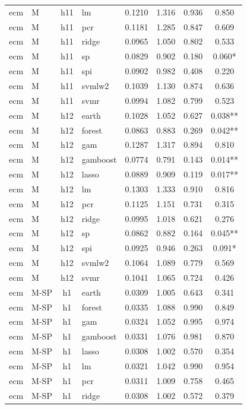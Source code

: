 \begin{ThreePartTable}
\begin{longtable}[t]{llclcccc}
ecm & M & h11 & lm & 0.1210 & 1.316 & 0.936 & 0.850\\
ecm & M & h11 & pcr & 0.1181 & 1.285 & 0.847 & 0.609\\
ecm & M & h11 & ridge & 0.0965 & 1.050 & 0.802 & 0.533\\
ecm & M & h11 & sp & 0.0829 & 0.902 & 0.180 & 0.060*\\
ecm & M & h11 & spi & 0.0902 & 0.982 & 0.408 & 0.220\\
ecm & M & h11 & svmlw2 & 0.1039 & 1.130 & 0.874 & 0.636\\
ecm & M & h11 & svmr & 0.0994 & 1.082 & 0.799 & 0.523\\
\addlinespace
ecm & M & h12 & earth & 0.1028 & 1.052 & 0.627 & 0.038**\\
ecm & M & h12 & forest & 0.0863 & 0.883 & 0.269 & 0.042**\\
ecm & M & h12 & gam & 0.1287 & 1.317 & 0.894 & 0.810\\
ecm & M & h12 & gamboost & 0.0774 & 0.791 & 0.143 & 0.014**\\
ecm & M & h12 & lasso & 0.0889 & 0.909 & 0.119 & 0.017**\\
ecm & M & h12 & lm & 0.1303 & 1.333 & 0.910 & 0.816\\
ecm & M & h12 & pcr & 0.1125 & 1.151 & 0.731 & 0.315\\
ecm & M & h12 & ridge & 0.0995 & 1.018 & 0.621 & 0.276\\
ecm & M & h12 & sp & 0.0862 & 0.882 & 0.164 & 0.045**\\
ecm & M & h12 & spi & 0.0925 & 0.946 & 0.263 & 0.091*\\
ecm & M & h12 & svmlw2 & 0.1064 & 1.089 & 0.779 & 0.569\\
ecm & M & h12 & svmr & 0.1041 & 1.065 & 0.724 & 0.426\\
\addlinespace
ecm & M-SP & h1 & earth & 0.0309 & 1.005 & 0.643 & 0.341\\
ecm & M-SP & h1 & forest & 0.0335 & 1.088 & 0.990 & 0.849\\
ecm & M-SP & h1 & gam & 0.0324 & 1.052 & 0.995 & 0.974\\
ecm & M-SP & h1 & gamboost & 0.0331 & 1.076 & 0.981 & 0.870\\
ecm & M-SP & h1 & lasso & 0.0308 & 1.002 & 0.570 & 0.354\\
ecm & M-SP & h1 & lm & 0.0321 & 1.042 & 0.990 & 0.954\\
ecm & M-SP & h1 & pcr & 0.0311 & 1.009 & 0.758 & 0.465\\
ecm & M-SP & h1 & ridge & 0.0308 & 1.002 & 0.572 & 0.379\\

\end{longtable}
\end{ThreePartTable}
